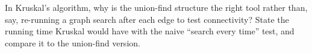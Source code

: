 \begin{exercise}\label{ch23:ex-unionfind-why}
In Kruskal's algorithm, why is the union-find structure the right tool rather
than, say, re-running a graph search after each edge to test connectivity? State
the running time Kruskal would have with the naive ``search every time'' test,
and compare it to the union-find version.
\end{exercise}
